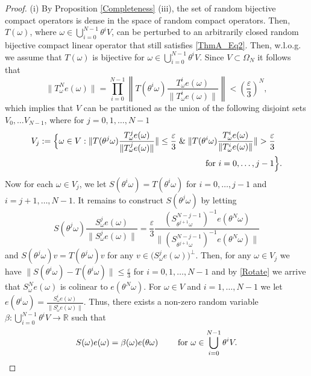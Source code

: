 \documentclass[pdflatex,sn-mathphys-num]{sn-jnl}%
\theoremstyle{thmstyleone}%
\theoremstyle{thmstyletwo}%
\theoremstyle{thmstylethree}%
\newcommand{\R}{\mathbb{R}}
\newcommand{\eps}{\varepsilon}
\numberwithin{equation}{section}
\begin{document}
\begin{proof}
(i) By Proposition \ref{Completeness} (iii), the set of random bijective compact operators is dense in the space of random compact operators. Then,  $T(\omega)$, where $\omega\in \bigcup_{i=0}^{N-1}\theta^i V$, can be perturbed to an arbitrarily closed random bijective compact linear operator that still satisfies \eqref{ThmA_Eq2}.  Then, w.l.o.g. we  assume that $T(\omega)$ is bijective for $\omega\in \bigcup_{i=0}^{N-1}\theta^i V$. Since $V\subset \Omega_N$ it follows that 
 \[
\|T^N_{\omega} e(\omega)\|=
\prod_{i=0}^{N-1}\left\|T(\theta^i\omega)\frac{T^{i}_{\omega}e(\omega)}{\|T^{i}_{\omega}e(\omega)\|}\right\|<
\left(\frac{\eps}{3}\right)^N,
\]
which implies that $V$ can be partitioned as the  union of the following disjoint sets $V_0,\dots V_{N-1}$, where for $j=0,1,\dots,N-1$
\begin{align*}
V_{j}
&:=
\Big\{\omega\in V: \|T(\theta^{j}\omega )\frac{T^{j}_{\omega}e(\omega)}{\|T^{j}_{\omega}e(\omega)\|}\|\leq \frac{\eps}{3}\; \&\; \|T(\theta^i\omega)\frac{T^{i}_{\omega}e(\omega)}{\|T^{i}_{\omega}e(\omega)\|}\|>\frac{\eps}{3}\notag\\
&\hspace{6.8cm} \hbox{ for } i=0,\dots,j-1\Big\}.   
\end{align*}
Now for each $\omega\in V_{j}$, we let $S(\theta^i\omega)=T(\theta^i\omega)$ for $i=0,\dots,j-1$ and $i=j+1,\dots, N-1$. It remains to construct $S (\theta^j\omega)$ by letting 
\begin{equation}\label{Rotate}
S(\theta^j\omega)
\frac{S^{j}_{\omega}e(\omega)}{\|S^{j}_{\omega}e(\omega)\|}
=
\frac{\eps }{3} 
\frac{(S^{N-j-1}_{\theta^{j+1}\omega})^{-1}e(\theta^N\omega)}{\|(S^{N-j-1}_{\theta^{j+1}\omega})^{-1}e(\theta^N\omega)\|}
\end{equation}
and $S(\theta^j\omega) v
=T(\theta^j\omega) v$ for any $v\in \big(S^{j}_{\omega}e(\omega)\big)^{\perp}$. Then, for any $\omega\in V_{j}$ we have $\|S(\theta^i\omega)-T(\theta^i\omega)\|\leq \frac{\eps}{3}$ for $i=0,1,\dots,N-1$ and by \eqref{Rotate} we arrive that $S^N_{\omega}e(\omega)$ is colinear to $e(\theta^N\omega)$. For $\omega\in V$ and $i=1,\dots,N-1$ we let $e(\theta^i\omega)=\frac{S_{\omega}^i e(\omega)}{\|S_{\omega}^i e(\omega)\|}$. Thus, there exists a non-zero random variable $\beta:\bigcup_{i=0}^{N-1}\theta^i V\rightarrow\R$ such that 
\begin{equation*}\label{Colinearity_01}
S(\omega) e(\omega)=\beta(\omega)e(\theta\omega)\qquad\hbox{ for } \omega\in \bigcup_{i=0}^{N-1}\theta^i V.
\end{equation*}

\end{proof}
\end{document}

